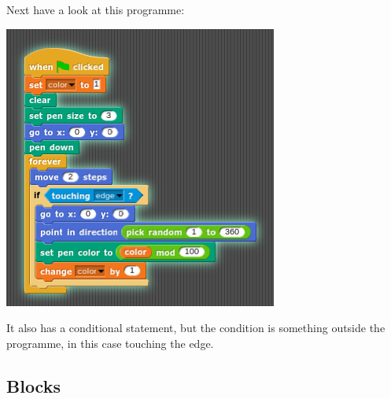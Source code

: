 \documentclass[11pt,a4paper]{scrartcl}
\begin{document}
Next have a look at this programme:
\begin{center}
\includegraphics{center_rays.png}
\end{center}
It also has a conditional statement, but the condition is something
outside the programme, in this case touching the edge.

\subsection*{Blocks}
\end{document}
